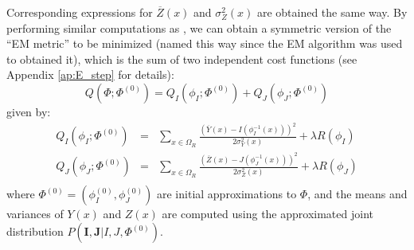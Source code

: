 Corresponding expressions for $\overline{Z}(x)$ and $\sigma_{Z}^{2}(x)$ are obtained the same way. By performing similar computations as \cite{Arce-santana2014}, we can obtain a symmetric version of the ``EM metric'' to be minimized (named this way since the EM algorithm was used to obtained it), which is the sum of two independent cost functions (see Appendix \ref{ap:E_step} for details):
\begin{equation}\label{eq:SyNEM_energy}
    Q(\Phi; \Phi^{(0)}) = Q_{I}(\phi_{I}; \Phi^{(0)}) + Q_{J}(\phi_{J}; \Phi^{(0)})
\end{equation}
given by:
\begin{equation}\label{eq:SyNEM_energy_split}
    \begin{array}{lll}
        Q_{I}(\phi_{I}; \Phi^{(0)}) &=& \sum_{x \in \Omega_{R}} \frac{\left(\overline{Y}(x) - I(\phi_{I}^{-1}(x))\right)^{2}}{2\sigma^{2}_{Y}(x)} + \lambda R(\phi_{I}) \\
        Q_{J}(\phi_{J}; \Phi^{(0)}) &=& \sum_{x \in \Omega_{R}} \frac{\left(\overline{Z}(x) - J(\phi_{J}^{-1}(x))\right)^{2}}{2\sigma^{2}_{Z}(x)} + \lambda R(\phi_{J}) \\
    \end{array}
\end{equation}
where $\Phi^{(0)} = (\phi_{I}^{(0)}, \phi_{J}^{(0)})$ are initial approximations to $\Phi$, and the means and variances of $Y(x)$ and $Z(x)$ are computed using the approximated joint distribution $P(\mathbf{I}, \mathbf{J} | I, J, \Phi^{(0)})$.\\

